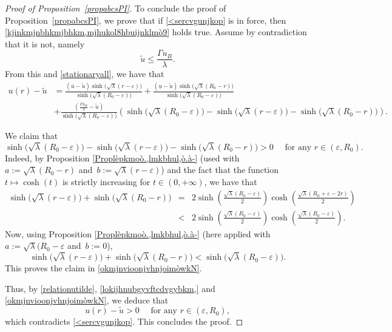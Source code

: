 \documentclass[12pt,a4paper,intlimits,sumlimits]{amsart}
\theoremstyle{definition}
\theoremstyle{plain}
\numberwithin{equation}{section}
\renewcommand{\le}{\leqslant}
\begin{document}
\begin{proof}[Proof of Proposition~\ref{propabcsPI}]
To conclude the proof of Proposition~\ref{propabcsPI}, we prove that if \eqref{<sercvgunjkop} is in force, then \eqref{kjinkmjnbhkmjbhkm,mjhukol8hbuijnklmò9} holds true. Assume by contradiction that it is not, namely
\begin{equation}\label{lokijhnubgyvftcdvgybkm,}
\widetilde u \le\frac{\Gamma u_B}{\lambda}.
\end{equation}
From this and \eqref{stationaryall}, we have that
\[
\begin{split}
u(r)-\widetilde u&= \frac{(\overline{u}-\widetilde u)
\sinh\big(\sqrt{\lambda}(r-\varepsilon)\big)}{\sinh\big(\sqrt{\lambda}(R_0-\varepsilon)\big)} +\frac{(\underline{u}-\widetilde u)\sinh\big(\sqrt{\lambda}(R_0-r)\big)}{\sinh\big(\sqrt{\lambda}(R_0-\varepsilon)\big)}\\
&+\frac{\left(\frac{\Gamma u_B}{\lambda}-\widetilde u\right)}{\sinh\big(\sqrt{\lambda}(R_0-\varepsilon)\big)}\left(\sinh\big(\sqrt{\lambda}(R_0-\varepsilon)\big)- \sinh\big(\sqrt{\lambda}(r-\varepsilon)\big) -\sinh\big(\sqrt{\lambda}(R_0-r)\big)\right).
\end{split}
\]

We claim that
\begin{equation}\label{okmjnvioonjvhnjoimòwkN}
\sinh\big(\sqrt{\lambda}(R_0-\varepsilon)\big)- \sinh\big(\sqrt{\lambda}(r-\varepsilon)\big) -\sinh\big(\sqrt{\lambda}(R_0-r)\big)>0 \quad\mbox{ for any } r\in (\varepsilon, R_0).
\end{equation}
Indeed, by Proposition \ref{Proplèpkmoò.,lmkbhul,ò.à-} (used with~$a:=\sqrt\lambda(R_0-r)$ and~$b:=\sqrt\lambda(r-\varepsilon)$)
and the fact that the function $t\mapsto\cosh(t)$ is strictly increasing for $t\in (0, +\infty)$, we have that
\begin{eqnarray*} \sinh\big(\sqrt{\lambda}(r-\varepsilon)\big)+\sinh\big(\sqrt{\lambda}(R_0-r)\big)&= &
2\sinh\left(\frac{\sqrt\lambda (R_0-\varepsilon)}{2}\right) \cosh\left(\frac{\sqrt\lambda (R_0+\varepsilon-2r)}{2}\right)
\\&<&2\sinh\left(\frac{\sqrt\lambda (R_0-\varepsilon)}{2}\right)\cosh\left(\frac{\sqrt\lambda (R_0-\varepsilon)}{2}\right).\end{eqnarray*}
Now, using Proposition \ref{Proplèpkmoò.,lmkbhul,ò.à-} (here applied with~$a:=\sqrt\lambda(R_0-\varepsilon$ and~$b:=0$),
\[
\sinh\big(\sqrt{\lambda}(r-\varepsilon)\big)+\sinh\big(\sqrt{\lambda}(R_0-r)\big) < \sinh\big(\sqrt{\lambda}(R_0-\varepsilon)\big).
\]
This proves the claim in \eqref{okmjnvioonjvhnjoimòwkN}.

Thus, by \eqref{relationutilde}, \eqref{lokijhnubgyvftcdvgybkm,} and \eqref{okmjnvioonjvhnjoimòwkN}, we deduce that
\[
u(r)-\widetilde u>0 \quad\mbox{ for any } r\in (\varepsilon, R_0), 
\]
which contradicts \eqref{<sercvgunjkop}.  This concludes the proof.
\end{proof}
\end{document}
